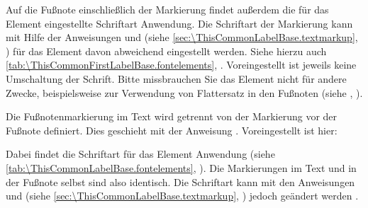 \BeginIndexGroup
{}%
%
Auf%
 die Fußnote einschließlich der Markierung findet außerdem die für das
Element  eingestellte
Schriftart Anwendung. Die %
Schriftart der Markierung kann %
%
mit Hilfe der Anweisungen  und
 (siehe
\autoref{sec:\ThisCommonLabelBase.textmarkup},
) für das Element
 davon
abweichend eingestellt werden. Siehe hierzu auch
\autoref{tab:\ThisCommonFirstLabelBase.fontelements},
.  Voreingestellt ist
jeweils keine Umschaltung der Schrift.%
 Bitte missbrauchen Sie das Element nicht für andere
Zwecke, beispielsweise zur Verwendung von Flattersatz in den Fußnoten (siehe
,
).

%
%
Die Fußnotenmarkierung im Text wird getrennt von der Markierung vor der
Fußnote definiert. Dies geschieht mit der Anweisung
. Voreingestellt ist hier:
\begin{lstcode}
\end{lstcode}
Dabei findet%
 die Schriftart für das Element
%
 Anwendung (siehe %
\autoref{tab:\ThisCommonLabelBase.fontelements},
). Die Markierungen im Text
und in der Fußnote selbst sind also identisch. Die Schriftart kann mit den
Anweisungen  und
 (siehe
\autoref{sec:\ThisCommonLabelBase.textmarkup},
) jedoch geändert werden%
.

